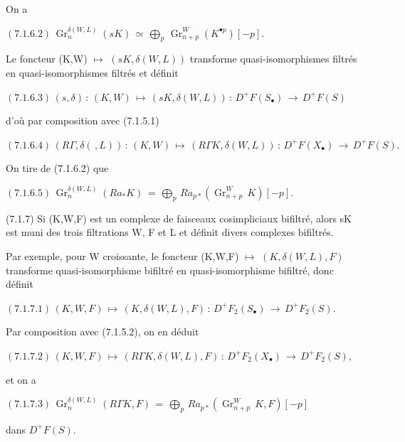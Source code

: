 \documentclass[11pt,twoside]{article}
\newcommand{\DFormula}[1]{%
  \par\smallskip\noindent\hspace*{0pt}\(\displaystyle #1\)\par\smallskip
}
\begin{document}
On a\par
\par\medskip
\DFormula{(7.1.6.2)\,\operatorname{Gr}_{n}^{\delta (W,L)}(sK)\,\simeq \,⨁_{p}\,\operatorname{Gr}_{n+p}^{W}(K^{\bullet p})[−p].}
\par\medskip
Le foncteur (K,W) \(↦\) \((sK,\delta (W,L))\) transforme quasi-isomorphismes filtrés en quasi-isomorphismes filtrés et définit\par
\par\medskip
\DFormula{(7.1.6.3)\,(s,\delta )\,:\,(K,W)\,↦\,(sK,\delta (W,L))\,:\,D^{+}F(S_{\bullet })\,\to \,D^{+}F(S)}
\par\medskip
d’où par composition avec (7.1.5.1)\par
\par\medskip
\DFormula{(7.1.6.4)\,(R\Gamma ,\delta (\,,L))\,:\,(K,W)\,↦\,(R\Gamma K,\delta (W,L))\,:\,D^{+}F(X_{\bullet })\,\to \,D^{+}F(S).}
\par\medskip
On tire de (7.1.6.2) que\par
\par\medskip
\DFormula{(7.1.6.5)\,\operatorname{Gr}_{n}^{\delta (W,L)}(Ra_{\ast }K)\,=\,⨁_{p}\,Ra_{p\ast }(\operatorname{Gr}_{n+p}^{W}\,K)[−p].}
\par\medskip
(7.1.7) Si (K,W,F) est un complexe de faisceaux cosimpliciaux bifiltré, alors sK est muni des trois filtrations W, F et L et définit divers complexes bifiltrés.\par
\par\medskip
Par exemple, pour W croissante, le foncteur (K,W,F) \(↦\) \((K,\delta (W,L),F)\) transforme quasi-isomorphisme bifiltré en quasi-isomorphisme bifiltré, donc définit\par
\par\medskip
\DFormula{(7.1.7.1)\,(K,W,F)\,↦\,(K,\delta (W,L),F)\,:\,D^{+}F_{2}(S_{\bullet })\,\to \,D^{+}F_{2}(S).}
\par\medskip
Par composition avec (7.1.5.2), on en déduit\par
\par\medskip
\DFormula{(7.1.7.2)\,(K,W,F)\,↦\,(R\Gamma K,\delta (W,L),F)\,:\,D^{+}F_{2}(X_{\bullet })\,\to \,D^{+}F_{2}(S),}
\par\medskip
et on a\par
\par\medskip
\DFormula{(7.1.7.3)\,\operatorname{Gr}_{n}^{\delta (W,L)}(R\Gamma K,F)\,=\,⨁_{p}\,Ra_{p\ast }(\operatorname{Gr}_{n+p}^{W}\,K,F)[−p]}
\par\medskip
dans \(D^{+}F(S)\).\par
\end{document}
